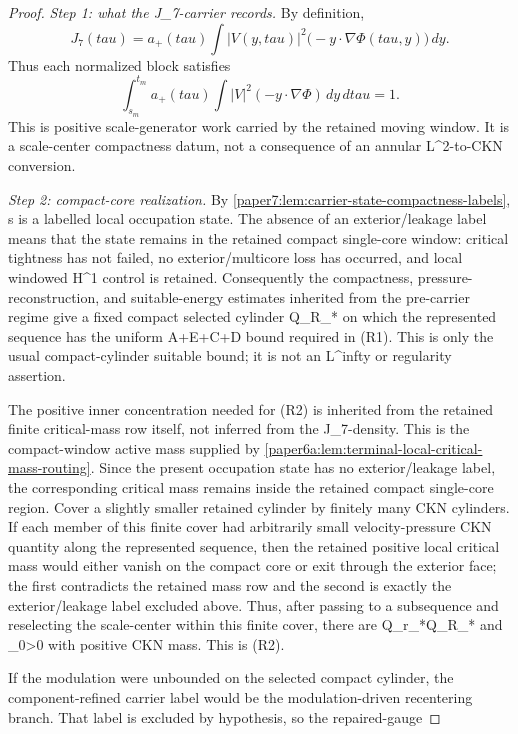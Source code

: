 \documentclass[11pt]{amsart}
\def\({}%
\def\){}%
\def\mathfrak#1{#1}%
\def\tau{tau}%
\def\infty{infty}%
\theoremstyle{plain}
\theoremstyle{definition}
\theoremstyle{remark}
\begin{document}
\begin{proof}
\emph{Step 1: what the \(J_7\)-carrier records.}  By definition,
\[
  J_7(\tau)=
  a_+(\tau)\int |V(y,\tau)|^2
  \bigl(-y\cdot\nabla\Phi(\tau,y)\bigr)\,dy .
\]
Thus each normalized block satisfies
\[
  \int_{s_m}^{t_m}
  a_+(\tau)\int |V|^2(-y\cdot\nabla\Phi)\,dy\,d\tau=1 .
\]
This is positive scale-generator work carried by the retained moving window.
It is a scale-center compactness datum, not a consequence of an annular
\(L^2\)-to-CKN conversion.
\par
\emph{Step 2: compact-core realization.}  By
\cref{paper7:lem:carrier-state-compactness-labels}, \(\mathfrak s\) is a
labelled local occupation state.  The absence of an exterior/leakage label means
that the state remains in the retained compact single-core window: critical
tightness has not failed, no exterior/multicore loss has occurred, and local
windowed \(H^1\) control is retained.  Consequently the compactness,
pressure-reconstruction, and suitable-energy estimates inherited from the
pre-carrier regime give a fixed compact selected cylinder \(Q_{R_*}\) on
which the represented sequence has the uniform \(A+E+C+D\) bound required in
(R1).  This is only the usual compact-cylinder suitable bound; it is not an
\(L^\infty\) or regularity assertion.
\par
The positive inner concentration needed for (R2) is inherited from the retained
finite critical-mass row itself, not inferred from the \(J_7\)-density.  This is
the compact-window active mass supplied by
\cref{paper6a:lem:terminal-local-critical-mass-routing}.  Since the present
occupation state has no exterior/leakage label, the corresponding critical mass
remains inside the retained compact single-core region.  Cover a
slightly smaller retained cylinder by finitely many CKN cylinders.  If each
member of this finite cover had arbitrarily small velocity-pressure CKN
quantity along the represented sequence, then the retained positive local
critical mass would either vanish on the compact core or exit through the
exterior face; the first contradicts the retained mass row and the second is
exactly the exterior/leakage label excluded above.  Thus, after passing to a
subsequence and reselecting the scale-center within this finite cover, there
are \(Q_{r_*}\Subset Q_{R_*}\) and \(\eta_0>0\) with positive CKN mass.  This
is (R2).
\par
If the modulation were unbounded on the selected compact cylinder, the
component-refined carrier label would be the modulation-driven recentering
branch.  That label is excluded by hypothesis, so the repaired-gauge

\end{proof}
\end{document}
